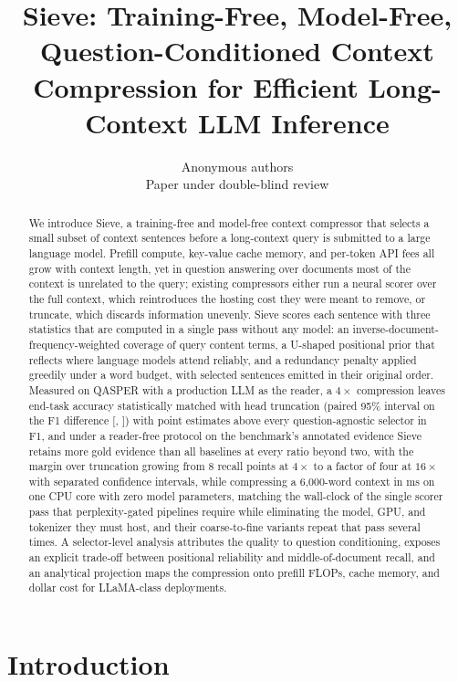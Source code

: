 \documentclass{article}
\title{Sieve: Training-Free, Model-Free, Question-Conditioned Context\\
Compression for Efficient Long-Context LLM Inference}
\author{
  Anonymous authors\\
  Paper under double-blind review
}
\newcommand{\method}{Sieve}
\begin{document}
\maketitle

\begin{abstract}
We introduce \method{}, a training-free and model-free context compressor
that selects a small subset of context sentences before a long-context
query is submitted to a large language model. Prefill compute, key-value
cache memory, and per-token API fees all grow with context length, yet in
question answering over documents most of the context is unrelated to the
query; existing compressors either run a neural scorer over the full
context, which reintroduces the hosting cost they were meant to remove, or
truncate, which discards information unevenly. \method{} scores each
sentence with three statistics that are computed in a single pass without
any model: an inverse-document-frequency-weighted coverage of query
content terms, a U-shaped positional prior that reflects where language
models attend reliably, and a redundancy penalty applied greedily under a
word budget, with selected sentences emitted in their original order.
Measured on QASPER with a production LLM as the reader, a $4\times$
compression leaves end-task accuracy statistically matched with
head truncation (paired 95\% interval on the F1 difference
[\PairSieveHeadFlo, \PairSieveHeadFhi]) with point estimates above
every question-agnostic selector in F1, and under a reader-free
protocol on the benchmark's annotated evidence Sieve retains more gold
evidence than all baselines at every
ratio beyond two, with the margin over truncation growing from
8 recall points at $4\times$ to a factor of four at
$16\times$ with separated confidence intervals, while compressing a
6{,}000-word context in \TimeSieveSixk{} ms on one CPU core with zero
model parameters, matching the wall-clock of the single scorer pass
that perplexity-gated pipelines require while eliminating the model,
GPU, and tokenizer they must host, and their coarse-to-fine variants
repeat that pass several times. A selector-level analysis attributes
the quality to question conditioning, exposes an explicit trade-off
between positional reliability and middle-of-document recall, and an
analytical projection maps the compression onto prefill FLOPs, cache
memory, and dollar cost for LLaMA-class deployments.
\end{abstract}

\section{Introduction}
\label{sec:intro}
\end{document}
